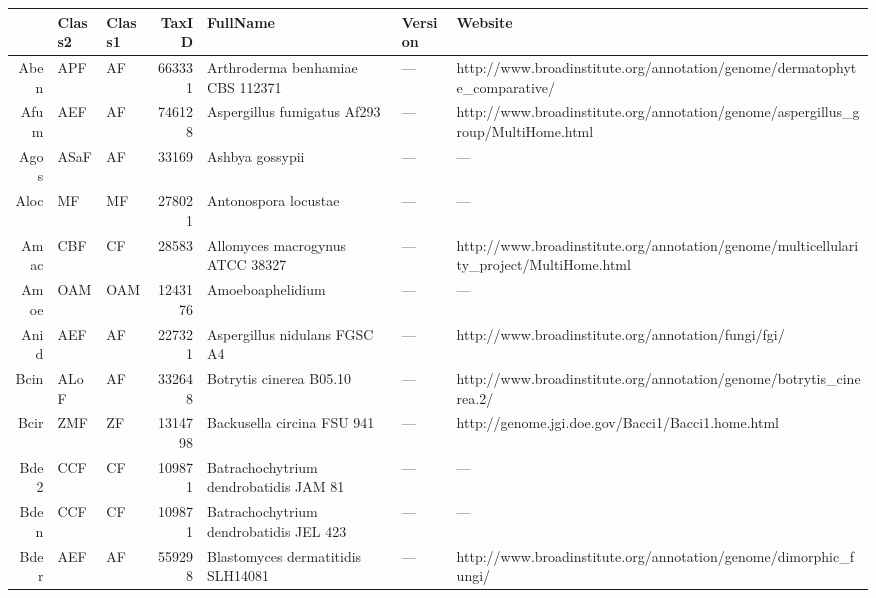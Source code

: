 
\begin{table}[tbp]
\centering
\begin{tabular}{rllrlll}
  \hline
\hline
 & Class2 & Class1 & TaxID & FullName & Version & Website \\ 
  \hline
Aben & APF & AF & 663331 & Arthroderma benhamiae CBS 112371 & --- & http://www.broadinstitute.org/annotation/genome/dermatophyte\_comparative/ \\ 
  Afum & AEF & AF & 746128 & Aspergillus fumigatus Af293 & --- & http://www.broadinstitute.org/annotation/genome/aspergillus\_group/MultiHome.html \\ 
  Agos & ASaF & AF & 33169 & Ashbya gossypii & --- & --- \\ 
  Aloc & MF & MF & 278021 & Antonospora locustae & --- & --- \\ 
  Amac & CBF & CF & 28583 & Allomyces macrogynus ATCC 38327 & --- & http://www.broadinstitute.org/annotation/genome/multicellularity\_project/MultiHome.html \\ 
  Amoe & OAM & OAM & 1243176 & Amoeboaphelidium & --- & --- \\ 
  Anid & AEF & AF & 227321 & Aspergillus nidulans FGSC A4 & --- & http://www.broadinstitute.org/annotation/fungi/fgi/ \\ 
  Bcin & ALoF & AF & 332648 & Botrytis cinerea B05.10 & --- & http://www.broadinstitute.org/annotation/genome/botrytis\_cinerea.2/ \\ 
  Bcir & ZMF & ZF & 1314798 & Backusella circina FSU 941 & --- & http://genome.jgi.doe.gov/Bacci1/Bacci1.home.html \\ 
  Bde2 & CCF & CF & 109871 & Batrachochytrium dendrobatidis JAM 81 & --- & --- \\ 
  Bden & CCF & CF & 109871 & Batrachochytrium dendrobatidis JEL 423 & --- & --- \\ 
  Bder & AEF & AF & 559298 & Blastomyces dermatitidis SLH14081 & --- & http://www.broadinstitute.org/annotation/genome/dimorphic\_fungi/ \\ 

\end{tabular}
\end{table}
